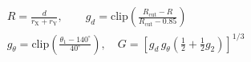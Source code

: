\documentclass[journal=jcisd8,manuscript=article,layout=two-column]{achemso}
\newcommand{\BX}{BondX Studio}
\begin{document}
\begin{gather}
R=\frac{d}{r_\mathrm{X}+r_\mathrm{Y}},\qquad g_d=\mathrm{clip}\!\left(\frac{R_\mathrm{cut}-R}{R_\mathrm{cut}-0.85}\right)\\
g_\theta=\mathrm{clip}\!\left(\frac{\theta_1-140^\circ}{40^\circ}\right),\quad G=\left[g_d\,g_\theta\left(\tfrac12+\tfrac12 g_2\right)\right]^{1/3}
\end{gather}
\end{document}
